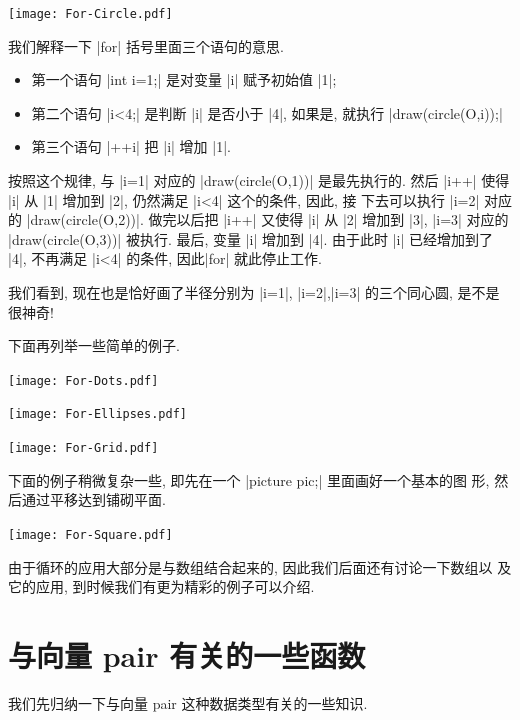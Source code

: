 \documentclass[nofonts,CJKnormalspaces]{ctexbook}
\begin{document}
\begin{center}\texttt{[image: For-Circle.pdf]}\end{center}%


我们解释一下 |for| 括号里面三个语句的意思.
\begin{itemize}
\item 第一个语句 |int i=1;| 是对变量 |i| 赋予初始值
  |1|;
\item 第二个语句 |i<4;| 是判断 |i| 是否小于 |4|,
  如果是, 就执行 |draw(circle(O,i));|
\item 第三个语句  |++i| 把 |i| 增加 |1|.
\end{itemize}

按照这个规律,  与 |i=1| 对应的 |draw(circle(O,1))| 是最先执行的. 然后
|i++| 使得 |i| 从 |1| 增加到 |2|, 仍然满足 |i<4| 这个的条件, 因此, 接
下去可以执行 |i=2| 对应的 |draw(circle(O,2))|. 做完以后把 |i++| 又使得
|i| 从 |2| 增加到 |3|, |i=3| 对应的 |draw(circle(O,3))| 被执行. 最后,
变量 |i| 增加到 |4|. 由于此时 |i| 已经增加到了 |4|, 不再满足 |i<4|
的条件, 因此|for| 就此停止工作.

我们看到, 现在也是恰好画了半径分别为 |i=1|, |i=2|,|i=3| 的三个同心圆,
是不是很神奇!

下面再列举一些简单的例子.
\begin{center}\texttt{[image: For-Dots.pdf]}\end{center}%


\begin{center}\texttt{[image: For-Ellipses.pdf]}\end{center}%


\begin{center}\texttt{[image: For-Grid.pdf]}\end{center}%


下面的例子稍微复杂一些, 即先在一个 |picture pic;| 里面画好一个基本的图
形, 然后通过平移达到铺砌平面.
\begin{center}\texttt{[image: For-Square.pdf]}\end{center}%


由于循环的应用大部分是与数组结合起来的, 因此我们后面还有讨论一下数组以
及它的应用, 到时候我们有更为精彩的例子可以介绍.

\section{与向量 pair  有关的一些函数}
我们先归纳一下与向量 pair 这种数据类型有关的一些知识.
\end{document}
